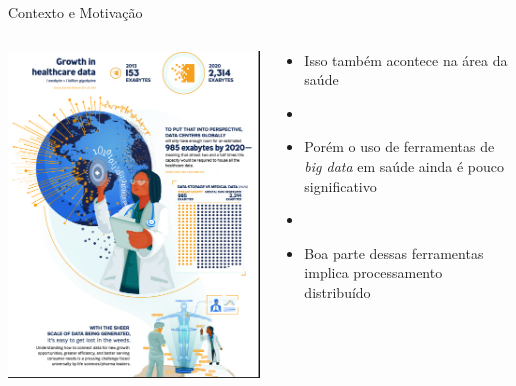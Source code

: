 \documentclass[10pt,brazil]{beamer}
\theoremstyle{definition}
\begin{document}
\begin{frame}[allowframebreaks]{Contexto e Motivação}
\begin{columns}
    \begin{column}{0.5\textwidth}
    \begin{center}
      \includegraphics[width=.9\textwidth,height=.75\textheight]{growthhealth.png}
      \end{center}
    \end{column}
    \begin{column}{0.5\textwidth}
      \begin{itemize}
        \item[] Isso também acontece na área da saúde
        \item[]
        \item[] Porém o uso de ferramentas de \emph{big data} em saúde ainda é pouco significativo
        \item[]
        \item[] Boa parte dessas ferramentas implica processamento distribuído
      \end{itemize}
    \end{column}
  \end{columns}
  \framebreak
  \begin{columns}%

\end{columns}
\end{frame}
\end{document}

